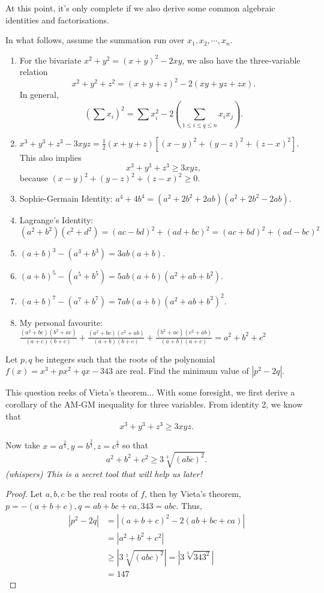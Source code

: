\documentclass[../jarvis.tex]{subfiles}
\begin{document}
At this point, it's only complete if we also derive some common algebraic identities and factorisations. 
\begin{proposition}[Classic]
    In what follows, assume the summation run over $x_1,x_2,\cdots,x_n$.
    \begin{enumerate}
        \item For the bivariate $x^2+y^2=(x+y)^2-2xy$, we also have the three-variable relation $$x^2+y^2+z^2=(x+y+z)^2-2(xy+yz+zx).$$
        In general, $$\left(\sum x_i\right)^2=\sum x_i^2-2\left(\sum_{1\leq i\leq q\leq n}x_ix_j\right).$$

        \item $x^3+y^3+z^3-3xyz=\frac{1}{2}(x+y+z)[(x-y)^2+(y-z)^2+(z-x)^2]$.
        This also implies $$x^3+y^3+z^3 \geq 3xyz,$$ because
        $(x-y)^2+(y-z)^2+(z-x)^2\geq 0$.
        \item Sophie-Germain Identity: $a^4+4b^4=(a^2+2b^2+2ab)(a^2+2b^2-2ab)$.
        \item Lagrange's Identity: $(a^2+b^2)(c^2+d^2)=(ac-bd)^2+(ad+bc)^2=(ac+bd)^2+(ad-bc)^2$
        \item $(a+b)^3-(a^3+b^3)=3ab(a+b)$.
        \item $(a+b)^5-(a^5+b^5)=5ab(a+b)(a^2+ab+b^2)$.
        \item $(a+b)^7-(a^7+b^7)=7ab(a+b)(a^2+ab+b^2)^2$.
        \item My personal favourite: $\frac{(a^2+bc)(b^2+ac)}{(a+c)(b+c)}+\frac{(a^2+bc)(c^2+ab)}{(a+b)(b+c)}+\frac{(b^2+ac)(c^2+ab)}{(a+b)(a+c)}=a^2+b^2+c^2$
    \end{enumerate}
\end{proposition}
\begin{example}[2016 SMO(O) P15]
    Let $p,q$ be integers such that the roots of the polynomial $f(x)=x^3+px^2+qx-343$ are real. Find the minimum value of $|p^2-2q|$.
\end{example}
This question reeks of Vieta's theorem... With some foresight, we first derive a corollary of the AM-GM inequality for three variables. From identity 2, we know that
    $$x^3+y^3+z^3 \geq 3xyz.$$

    Now take $x=a^{\frac{2}{3}}, y=b^{\frac{2}{3}}, z=c^{\frac{2}{3}}$ so that
    $$a^2+b^2+c^2\geq 3\sqrt[3]{(abc)^2}.$$
    \textit{(whispers) This is a secret tool that will help us later!}
\begin{proof}
    
    Let $a,b,c$ be the real roots of $f$, then by Vieta's theorem, $p=-(a+b+c), q=ab+bc+ca, 343=abc$.
    Thus,
    \begin{align*}
        |p^2-2q|&=|(a+b+c)^2-2(ab+bc+ca)| \\
        &=|a^2+b^2+c^2| \\
        &\geq |3\sqrt[3]{(abc)^2}| = |3\sqrt[3]{343^2}| \\
        &=\boxed{147}
    \end{align*}
\end{proof}
\end{document}

